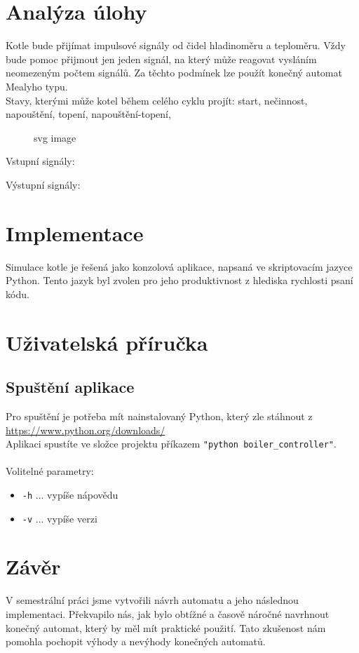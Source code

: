 \documentclass[12pt]{report}
\begin{document}
\chapter{Analýza úlohy}
Kotle bude přijímat impulsové signály od čidel hladinoměru a teploměru. Vždy bude pomoc přijmout jen jeden signál, na který může reagovat vysláním neomezeným počtem signálů.
Za těchto podmínek lze použít konečný automat Mealyho typu.\\
Stavy, kterými může kotel během celého cyklu projít: start, nečinnost, napouštění, topení, napouštění-topení,

\begin{figure}[htbp]
  \centering
  
  \caption{svg image}
\end{figure}


Vstupní signály: 

Výstupní signály: 

\chapter{Implementace}
Simulace kotle je řešená jako konzolová aplikace, napsaná ve skriptovacím jazyce Python. Tento jazyk byl zvolen pro jeho produktivnost z hlediska rychlosti psaní kódu.



\chapter{Uživatelská příručka}
\section{Spuštění aplikace}
Pro spuštění je potřeba mít nainstalovaný Python, který zle stáhnout z \url{https://www.python.org/downloads/}\\
Aplikaci spustíte ve složce projektu příkazem \texttt{"python boiler\_controller"}.\\
\\
Volitelné parametry:
\begin{itemize}
	\item \texttt{-h} ... vypíše nápovědu
	\item \texttt{-v} ... vypíše verzi
\end{itemize}


\chapter{Závěr}
V semestrální práci jsme vytvořili návrh automatu a jeho následnou implementaci.
Překvapilo nás, jak bylo obtížné a časově náročné navrhnout konečný automat, který by měl mít praktické použití. Tato zkušenost nám pomohla pochopit výhody a nevýhody konečných automatů.
\end{document}
